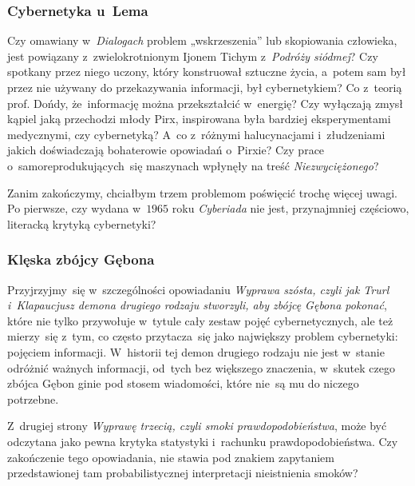 \documentclass[10pt,t]{beamer}
\begin{document}
\begin{frame}
  \frametitle{Cybernetyka u~Lema}


  Czy omawiany w~\textit{Dialogach} problem „wskrzeszenia” lub
  skopiowania człowieka, jest powiązany z~zwielokrotnionym Ijonem Tichym
  z~\textit{Podróży siódmej}? Czy spotkany przez niego uczony, który
  konstruował sztuczne życia, a~potem sam był przez nie używany do
  przekazywania informacji, był cybernetykiem? Co z~teorią prof. Dońdy,
  że~informację można przekształcić w~energię? Czy wyłączają zmysł kąpiel
  jaką przechodzi młody Pirx, inspirowana była bardziej eksperymentami
  medycznymi, czy cybernetyką? A~co z~różnymi halucynacjami i~złudzeniami
  jakich doświadczają bohaterowie opowiadań o~Pirxie? Czy prace
  o~samoreprodukujących~się maszynach wpłynęły na treść
  \textit{Niezwyciężonego}?

  Zanim zakończymy, chciałbym trzem problemom poświęcić trochę więcej uwagi.
  Po pierwsze, czy wydana w~$1965$ roku \textit{Cyberiada} nie jest,
  przynajmniej częściowo, literacką krytyką cybernetyki?

\end{frame}





\begin{frame}
  \frametitle{Klęska zbójcy Gębona}


  Przyjrzyjmy~się w~szczególności opowiadaniu \textit{Wyprawa szósta, czyli
    jak Trurl i~Klapaucjusz demona drugiego rodzaju stworzyli, aby zbójcę
    Gębona pokonać}, które nie tylko przywołuje w~tytule cały zestaw pojęć
  cybernetycznych, ale też mierzy~się z~tym, co często przytacza~się jako
  największy problem cybernetyki: pojęciem informacji. W~historii tej demon
  drugiego rodzaju nie jest w~stanie odróżnić ważnych informacji, od~tych
  bez większego znaczenia, w~skutek czego zbójca Gębon ginie pod stosem
  wiadomości, które nie~są mu do niczego potrzebne.

  Z~drugiej strony \textit{Wyprawę trzecią, czyli smoki
    prawdopodobieństwa}, może być odczytana jako pewna krytyka statystyki
  i~rachunku prawdopodobieństwa. Czy zakończenie tego opowiadania, nie
  stawia pod znakiem zapytaniem przedstawionej tam probabilistycznej
  interpretacji nieistnienia smoków?

\end{frame}
\end{document}

